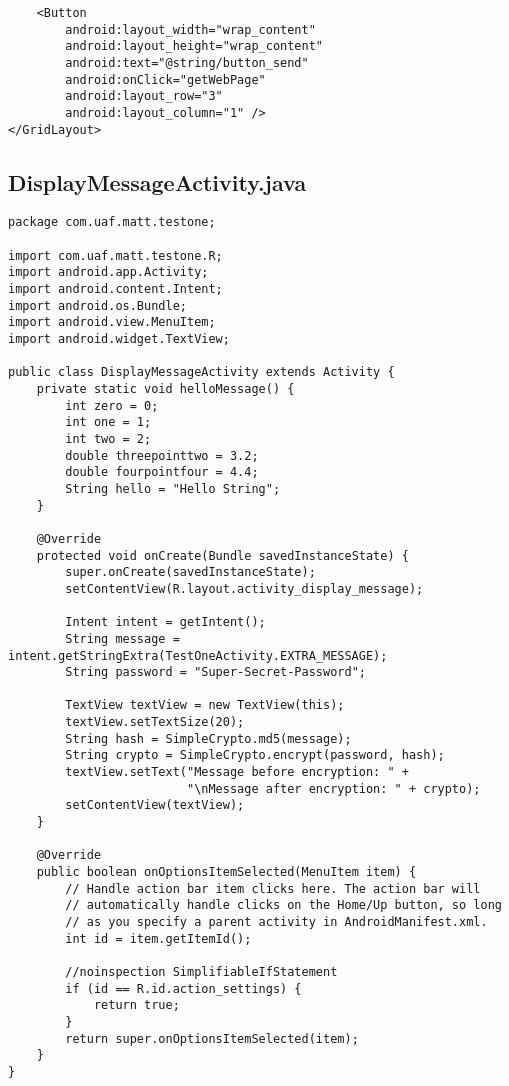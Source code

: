 \begin{lstlisting}
    <Button
        android:layout_width="wrap_content"
        android:layout_height="wrap_content"
        android:text="@string/button_send"
        android:onClick="getWebPage"
        android:layout_row="3"
        android:layout_column="1" />
</GridLayout>
\end{lstlisting}
\subsection{DisplayMessageActivity.java}
\label{app:camessageactivity}
\begin{lstlisting}
package com.uaf.matt.testone;

import com.uaf.matt.testone.R;
import android.app.Activity;
import android.content.Intent;
import android.os.Bundle;
import android.view.MenuItem;
import android.widget.TextView;

public class DisplayMessageActivity extends Activity {
    private static void helloMessage() {
        int zero = 0;
        int one = 1;
        int two = 2;
        double threepointtwo = 3.2;
        double fourpointfour = 4.4;
        String hello = "Hello String";
    }

    @Override
    protected void onCreate(Bundle savedInstanceState) {
        super.onCreate(savedInstanceState);
        setContentView(R.layout.activity_display_message);

        Intent intent = getIntent();
        String message = intent.getStringExtra(TestOneActivity.EXTRA_MESSAGE);
        String password = "Super-Secret-Password";

        TextView textView = new TextView(this);
        textView.setTextSize(20);
        String hash = SimpleCrypto.md5(message);
        String crypto = SimpleCrypto.encrypt(password, hash);
        textView.setText("Message before encryption: " +
                         "\nMessage after encryption: " + crypto);
        setContentView(textView);
    }

    @Override
    public boolean onOptionsItemSelected(MenuItem item) {
        // Handle action bar item clicks here. The action bar will
        // automatically handle clicks on the Home/Up button, so long
        // as you specify a parent activity in AndroidManifest.xml.
        int id = item.getItemId();

        //noinspection SimplifiableIfStatement
        if (id == R.id.action_settings) {
            return true;
        }
        return super.onOptionsItemSelected(item);
    }
}
\end{lstlisting}

